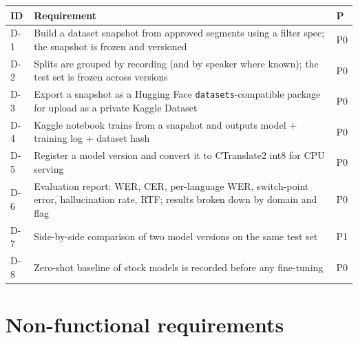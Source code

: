 \documentclass[11pt]{article}
\begin{document}
\begin{longtable}[]{@{}>{\raggedright\arraybackslash}p{}>{\raggedright\arraybackslash}p{}>{\raggedright\arraybackslash}p{}@{}}
\toprule\noalign{}
ID & Requirement & P \\
\midrule\noalign{}
\endhead
\bottomrule\noalign{}
\endlastfoot
D-1 & Build a dataset snapshot from approved segments using a filter spec; the snapshot is frozen and versioned & P0 \\
D-2 & Splits are grouped by recording (and by speaker where known); the test set is frozen across versions & P0 \\
D-3 & Export a snapshot as a Hugging Face \texttt{datasets}-compatible package for upload as a private Kaggle Dataset & P0 \\
D-4 & Kaggle notebook trains from a snapshot and outputs model + training log + dataset hash & P0 \\
D-5 & Register a model version and convert it to CTranslate2 int8 for CPU serving & P0 \\
D-6 & Evaluation report: WER, CER, per-language WER, switch-point error, hallucination rate, RTF; results broken down by domain and flag & P0 \\
D-7 & Side-by-side comparison of two model versions on the same test set & P1 \\
D-8 & Zero-shot baseline of stock models is recorded before any fine-tuning & P0 \\
\end{longtable}

\hypertarget{non-functional-requirements}{%
\section{Non-functional requirements}\label{non-functional-requirements}}
\end{document}
